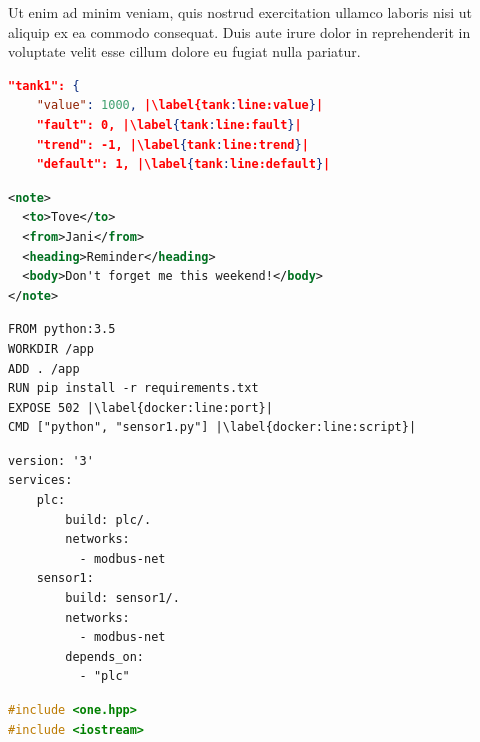 \documentclass[10pt,conference,a4paper,onecolumn] {IEEEtran}
\begin{document}
\begin{multicols}{2}
Ut enim ad minim veniam, quis nostrud exercitation ullamco laboris nisi ut aliquip ex ea commodo consequat. Duis aute irure dolor in reprehenderit in voluptate velit esse cillum dolore eu fugiat nulla pariatur.

\begin{lstlisting}[language=json, xleftmargin=2em, frame=single,framexleftmargin=1.5em, firstnumber=1,caption={Example of JSON listing},label={json:tank},captionpos=b,escapechar=|]
"tank1": {
    "value": 1000, |\label{tank:line:value}|
    "fault": 0, |\label{tank:line:fault}|
    "trend": -1, |\label{tank:line:trend}|
    "default": 1, |\label{tank:line:default}|
\end{lstlisting}
\label{gen}

\begin{lstlisting}[language=xml, xleftmargin=2em, frame=single,framexleftmargin=1.5em, firstnumber=1,caption={Example XML listing},label={json:plc},captionpos=b,escapechar=|]
<note>
  <to>Tove</to>
  <from>Jani</from>
  <heading>Reminder</heading>
  <body>Don't forget me this weekend!</body>
</note>
\end{lstlisting}

\begin{lstlisting}[language=docker, xleftmargin=2em, frame=single,framexleftmargin=1.5em, firstnumber=1, caption={Example Dockerfile}, breaklines=true, label={code:docker},label={list:docker},captionpos=b,escapechar=|]
FROM python:3.5
WORKDIR /app
ADD . /app
RUN pip install -r requirements.txt
EXPOSE 502 |\label{docker:line:port}|
CMD ["python", "sensor1.py"] |\label{docker:line:script}|
\end{lstlisting}

\begin{lstlisting}[language=docker-compose-3, xleftmargin=2em, frame=single,framexleftmargin=1.5em, firstnumber=1, caption={Example Docker-compose script}, breaklines=true, label={list:compose},captionpos=b,escapechar=|]
version: '3'
services:
    plc:
        build: plc/.
        networks:
          - modbus-net
    sensor1:
        build: sensor1/.
        networks:
          - modbus-net
        depends_on:
          - "plc"
\end{lstlisting}

\begin{lstlisting}[language=C,style=c, xleftmargin=2em, frame=single,framexleftmargin=1.5em, firstnumber=1, caption={Example C: Hello world!}, breaklines=true, label={list:compose},captionpos=b,escapechar=|]
#include <one.hpp>
#include <iostream>


\end{lstlisting}
\end{multicols}
\end{document}
